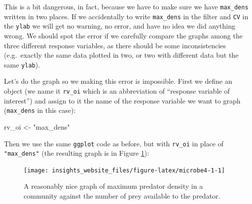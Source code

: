 \documentclass[]{book}
\newenvironment{Shaded}{\begin{snugshade}}{\end{snugshade}}
\newcommand{\DataTypeTok}[1]{\textcolor[rgb]{0.13,0.29,0.53}{#1}}
\newcommand{\DecValTok}[1]{\textcolor[rgb]{0.00,0.00,0.81}{#1}}
\newcommand{\FloatTok}[1]{\textcolor[rgb]{0.00,0.00,0.81}{#1}}
\newcommand{\KeywordTok}[1]{\textcolor[rgb]{0.13,0.29,0.53}{\textbf{#1}}}
\newcommand{\NormalTok}[1]{#1}
\newcommand{\OperatorTok}[1]{\textcolor[rgb]{0.81,0.36,0.00}{\textbf{#1}}}
\newcommand{\StringTok}[1]{\textcolor[rgb]{0.31,0.60,0.02}{#1}}
\begin{document}
\begin{Shaded}
\end{Shaded}

This is a bit dangerous, in fact, because we have to make sure we have \texttt{max\_dens} written in two places. If we accidentally to write \texttt{max\_dens} in the filter and \texttt{CV} in the \texttt{ylab} we will get no warning, no error, and have no idea we did anything wrong. We should spot the error if we carefully compare the graphs among the three different response variables, as there should be some inconsistencies (e.g.~exactly the same data plotted in two, or two with different data but the same \texttt{ylab}).

Let's do the graph so we making this error is impossible. First we define an object (we name it \texttt{rv\_oi} which is an abbreviation of ``response variable of interest'') and assign to it the name of the response variable we want to graph (\texttt{max\_dens} in this case):

\begin{Shaded}
\begin{Highlighting}[]
\NormalTok{rv_oi <-}\StringTok{ "max_dens"}
\end{Highlighting}
\end{Shaded}

Then we use the same \texttt{ggplot} code as before, but with \texttt{rv\_oi} in place of \texttt{"max\_dens"} (the resulting graph is in Figure \ref{fig:microbe4-1}):

\begin{figure}

{\centering \texttt{[image: insights\_website\_files/figure-latex/microbe4-1-1]} 

}

\caption{A reasonably nice graph of maximum predator density in a community against the number of prey available to the predator.}\label{fig:microbe4-1}
\end{figure}
\end{document}
